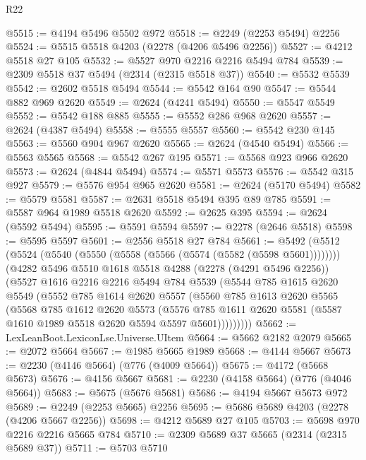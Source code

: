 \begin{lexlean}{R22}
\begin{coremodule}
@5515 := @4194 @5496 @5502 @972
@5518 := @2249 (@2253 @5494) @2256
@5524 := @5515 @5518 @4203 (@2278 (@4206 @5496 @2256))
@5527 := @4212 @5518 @27 @105
@5532 := @5527 @970 @2216 @2216 @5494 @784
@5539 := @2309 @5518 @37 @5494 (@2314 (@2315 @5518 @37))
@5540 := @5532 @5539
@5542 := @2602 @5518 @5494
@5544 := @5542 @164 @90
@5547 := @5544 @882 @969 @2620
@5549 := @2624 (@4241 @5494)
@5550 := @5547 @5549
@5552 := @5542 @188 @885
@5555 := @5552 @286 @968 @2620
@5557 := @2624 (@4387 @5494)
@5558 := @5555 @5557
@5560 := @5542 @230 @145
@5563 := @5560 @904 @967 @2620
@5565 := @2624 (@4540 @5494)
@5566 := @5563 @5565
@5568 := @5542 @267 @195
@5571 := @5568 @923 @966 @2620
@5573 := @2624 (@4844 @5494)
@5574 := @5571 @5573
@5576 := @5542 @315 @927
@5579 := @5576 @954 @965 @2620
@5581 := @2624 (@5170 @5494)
@5582 := @5579 @5581
@5587 := @2631 @5518 @5494 @395 @89 @785
@5591 := @5587 @964 @1989 @5518 @2620
@5592 := @2625 @395
@5594 := @2624 (@5592 @5494)
@5595 := @5591 @5594
@5597 := @2278 (@2646 @5518)
@5598 := @5595 @5597
@5601 := @2556 @5518 @27 @784
@5661 := @5492
    (@5512
      (@5524 (@5540 (@5550 (@5558 (@5566 (@5574 (@5582 (@5598 @5601))))))))
      (@4282
        @5496
        @5510
        @1618
        @5518
        @4288
        (@2278 (@4291 @5496 @2256))
        (@5527
          @1616
          @2216
          @2216
          @5494
          @784
          @5539
          (@5544
            @785
            @1615
            @2620
            @5549
            (@5552
              @785
              @1614
              @2620
              @5557
              (@5560
                @785
                @1613
                @2620
                @5565
                (@5568
                  @785
                  @1612
                  @2620
                  @5573
                  (@5576
                    @785
                    @1611
                    @2620
                    @5581
                    (@5587 @1610 @1989 @5518 @2620 @5594 @5597 @5601)))))))))
@5662 := LexLeanBoot.LexiconLse.Universe.UItem
@5664 := @5662 @2182 @2079
@5665 := @2072 @5664
@5667 := @1985 @5665 @1989
@5668 := @4144 @5667
@5673 := @2230 (@4146 @5664) (@776 (@4009 @5664))
@5675 := @4172 (@5668 @5673)
@5676 := @4156 @5667
@5681 := @2230 (@4158 @5664) (@776 (@4046 @5664))
@5683 := @5675 (@5676 @5681)
@5686 := @4194 @5667 @5673 @972
@5689 := @2249 (@2253 @5665) @2256
@5695 := @5686 @5689 @4203 (@2278 (@4206 @5667 @2256))
@5698 := @4212 @5689 @27 @105
@5703 := @5698 @970 @2216 @2216 @5665 @784
@5710 := @2309 @5689 @37 @5665 (@2314 (@2315 @5689 @37))
@5711 := @5703 @5710

\end{coremodule}
\end{lexlean}
